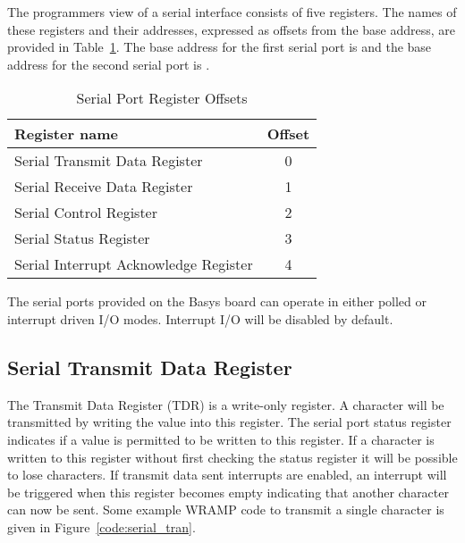 The programmers view of a serial interface consists of five registers.
The names of these registers and their addresses, expressed as offsets
from the base address, are provided in
Table~\ref{table:serial_offsets}. The base address for the first
serial port is \src{\LOCFSPBASE} and the base address for the
second serial port is \src{\LOCSSPBASE}.

\begin{table}[h]
\begin{center}
\begin{tabular}{|l|c|}
\hline
\textbf{Register name} & \textbf{Offset} \\
\hline
Serial Transmit Data Register & 0 \\
\hline
Serial Receive Data Register & 1 \\
\hline
Serial Control Register & 2 \\
\hline
Serial Status Register & 3 \\
\hline
Serial Interrupt Acknowledge Register & 4 \\
\hline
\end{tabular}
\caption{Serial Port Register Offsets}
\label{table:serial_offsets}
\end{center}
\end{table}

The serial ports provided on the Basys board can operate in either
polled or interrupt driven I/O modes. Interrupt I/O will be disabled
by default.

\subsection{Serial Transmit Data Register}

The Transmit Data Register (TDR) is a write-only register. A character
will be transmitted by writing the value into this register. The
serial port status register indicates if a value is permitted to be
written to this register. If a character is written to this register
without first checking the status register it will be possible to lose
characters. If transmit data sent interrupts are enabled, an interrupt
will be triggered when this register becomes empty indicating that
another character can now be sent. Some example WRAMP code to transmit
a single character is given in Figure~\ref{code:serial_tran}.

